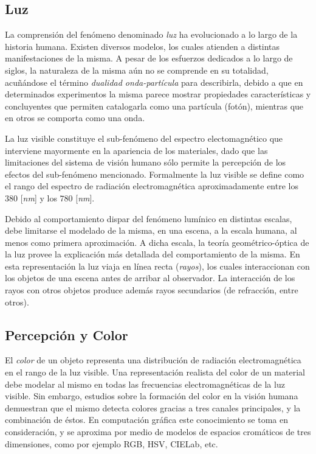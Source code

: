 \subsection{Luz}%
La comprensión del fenómeno denominado {\em luz} ha evolucionado a lo largo de la historia humana.
Existen diversos modelos, los cuales atienden a distintas manifestaciones de la misma.
A pesar de los esfuerzos dedicados a lo largo de siglos, la naturaleza de la misma aún no se comprende en su totalidad, acuñándose el término {\em dualidad onda-partícula} para describirla, debido a que en determinados experimentos la misma parece mostrar propiedades características y concluyentes que permiten catalogarla como una partícula (fotón), mientras que en otros se comporta como una onda.

La luz visible constituye el sub-fenómeno del espectro electomagnético que interviene mayormente en la apariencia de los materiales, dado que las limitaciones del sistema de visión humano sólo permite la percepción de los efectos del sub-fenómeno mencionado.
Formalmente la luz visible se define como el rango del espectro de radiación electromagnética aproximadamente entre los  $380$ [{\em nm}] y los $780$ [{\em nm}].

Debido al comportamiento dispar del fenómeno lumínico en distintas escalas, debe limitarse el modelado de la misma, en una escena, a la escala humana, al menos como primera aproximación.
A dicha escala, la teoría geométrico-óptica de la luz provee la explicación más detallada del comportamiento de la misma.
En esta representación la luz viaja en línea recta ({\em rayos}), los cuales interaccionan con los objetos de una escena antes de arribar al observador.
La interacción de los rayos con otros objetos produce además rayos secundarios (de refracción, entre otros).

\subsection{Percepción y Color}
El {\em color} de un objeto representa una distribución de radiación electromagnética en el rango de la luz visible.
Una representación realista del color de un material debe modelar al mismo en todas las frecuencias electromagnéticas de la luz visible.
Sin embargo, estudios sobre la formación del color en la visión humana demuestran que el mismo detecta colores gracias a tres canales principales, y la combinación de éstos.
En computación gráfica este conocimiento se toma en consideración, y se aproxima por medio de modelos de espacios cromáticos de tres dimensiones, como por ejemplo \acrshort{RGB}, \acrshort{HSV}, CIELab, etc.

